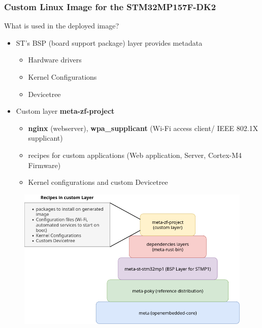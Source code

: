 \documentclass[8pt,compress,aspectratio=169]{beamer}
\newcommand\DarkBold[1]{\textcolor{VSBlueDark}{\textbf{#1}}}
\newcommand\DarkBoldP[1]{\textcolor{VSPurpleDark}{\textbf{#1}}}
\begin{document}
\begin{frame}
  \frametitle{Custom Linux Image for the STM32MP157F-DK2}
  \begin{minipage}{0.475\textwidth}
    \begin{block}{What is used in the deployed image?}
      \begin{itemize}
        \item ST's BSP (board support package) layer provides metadata 
          \begin{itemize}
            \small
            \item Hardware drivers
            \item Kernel Configurations
            \item Devicetree
          \end{itemize}
        \item Custom layer \DarkBoldP{meta-zf-project}
          \begin{itemize}
            \small
            \item \DarkBold{nginx} (webserver), \DarkBold{wpa\_supplicant} (Wi-Fi access client/
              IEEE 802.1X supplicant)
            \item recipes for custom applications (Web application, Server, Cortex-M4 Firmware)
            \item Kernel configurations and custom Devicetree
          \end{itemize}
      \end{itemize}
    \end{block}
  \end{minipage}
  \hfill
  \begin{minipage}{0.5\textwidth}
    \begin{figure}
      \includegraphics[width=1.125\textwidth]{assets/diagrams/layers.png}

\end{figure}
\end{minipage}
\end{frame}
\end{document}
